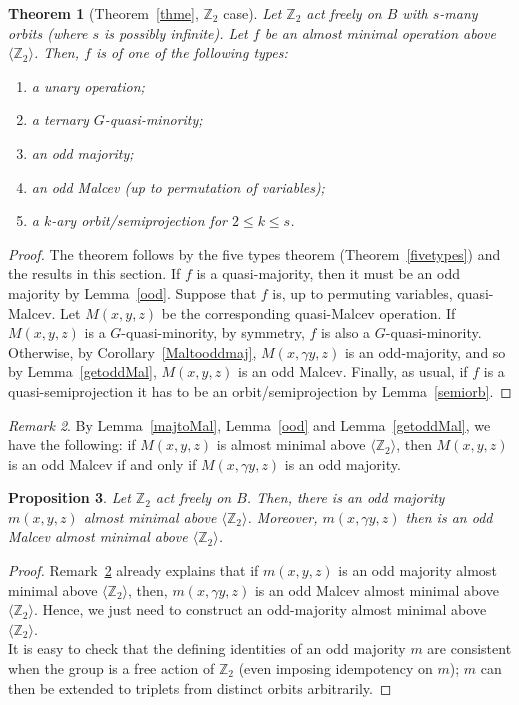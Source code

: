 \documentclass{article}
\newtheorem{theorem}{Theorem}[section]
\newtheorem{prop}[theorem]{Proposition}
\theoremstyle{remark}
\newtheorem{remark}[theorem]{Remark}
\theoremstyle{definition}
\begin{document}
\begin{theorem}[Theorem~\ref{thme}, $\mathbb{Z}_2 $ case]\label{Z2case} Let $\mathbb{Z}_2$ act freely on $B$ with $s$-many orbits (where $s$ is possibly infinite). Let $f$ be an almost minimal operation above ${\langle \mathbb{Z}_2 \rangle}$. Then,  $f$ is of one of the following types:
\begin{enumerate}
    \item a unary operation;
    \item a ternary $G$-quasi-minority;
    \item an odd majority;
    \item an odd Malcev (up to permutation of variables);
    \item a $k$-ary orbit\-/semiprojection for $2\leq k \leq s$.
\end{enumerate} 
\end{theorem}
\begin{proof} The theorem follows by the five types theorem (Theorem~\ref{fivetypes}) and the results in this section. If $f$ is a quasi-majority, then it must be an odd majority by Lemma~\ref{ood}. Suppose that $f$ is, up to permuting variables, quasi-Malcev. 
Let $M(x,y,z)$ be the corresponding quasi-Malcev operation. If $M(x,y,z)$ is a $G$-quasi-minority, by symmetry, $f$ is also a $G$-quasi-minority. Otherwise, by Corollary~\ref{Maltooddmaj}, $M(x, \gamma y, z)$ is an odd-majority, and so by Lemma~\ref{getoddMal}, $M(x,y,z)$ is an odd Malcev.
Finally, as usual, if $f$ is a quasi-semiprojection it has to be an orbit\-/semiprojection by Lemma~\ref{semiorb}.
\end{proof}

\begin{remark}\label{duality} 
By Lemma~\ref{majtoMal}, Lemma~\ref{ood} and Lemma~\ref{getoddMal}, we have the following: if $M(x,y,z)$ is almost minimal above ${\langle \mathbb{Z}_2\rangle}$, then $M(x,y,z)$ is an odd Malcev if and only if $M(x, \gamma y, z)$ is an odd majority.
\end{remark}


\begin{prop}\label{prop:optimalZ2} Let $\mathbb{Z}_2$ act freely on $B$. Then, there is an odd majority $m(x,y,z)$ almost minimal above ${\langle \mathbb{Z}_2\rangle}$. Moreover, $m(x, \gamma y, z)$ then is an odd Malcev almost minimal above ${\langle \mathbb{Z}_2\rangle}$.
\end{prop}
\begin{proof} Remark~\ref{duality} already explains that if $m(x,y,z)$ is an odd majority almost minimal above ${\langle \mathbb{Z}_2\rangle}$, then, $m(x, \gamma y, z)$ is an odd Malcev almost minimal above ${\langle \mathbb{Z}_2\rangle}$. Hence, we just need to construct an odd-majority almost minimal above ${\langle \mathbb{Z}_2\rangle}$. \\

It is easy to check that the defining identities of an odd majority $m$ are consistent when the group is a free action of $\mathbb Z_2$ (even imposing idempotency on $m$); $m$ can then be extended to triplets from distinct orbits arbitrarily.
\end{proof}
\end{document}
